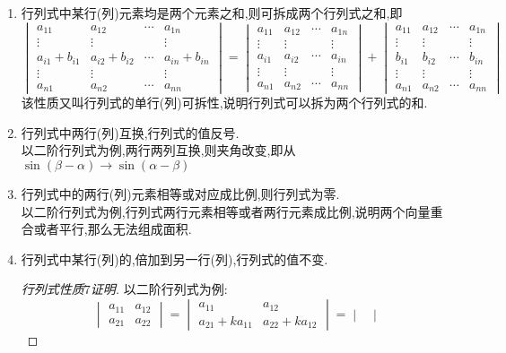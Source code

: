 \documentclass[8pt a4paper, oneside, UTF8]{ctexbook}
\begin{document}
\begin{sloppypar}
\begin{enumerate}
        \item 行列式中某行(列)元素均是两个元素之和,则可拆成两个行列式之和,即
        $$\begin{vmatrix}a_{11}&a_{12}&\cdots&a_{1n}\\\vdots&\vdots&&\vdots\\a_{i1}+b_{i1}&a_{i2}+b_{i2}&\cdots&a_{in}+b_{in}\\\vdots&\vdots&&\vdots\\a_{n1}&a_{n2}&\cdots&a_{nn}\end{vmatrix}=\begin{vmatrix}a_{11}&a_{12}&\cdots&a_{1n}\\\vdots&\vdots&&\vdots\\a_{i1}&a_{i2}&\cdots&a_{in}\\\vdots&\vdots&&\vdots\\a_{n1}&a_{n2}&\cdots&a_{nn}\end{vmatrix}+\begin{vmatrix}a_{11}&a_{12}&\cdots&a_{1n}\\\vdots&\vdots&&\vdots\\b_{i1}&b_{i2}&\cdots&b_{in}\\\vdots&\vdots&&\vdots\\a_{n1}&a_{n2}&\cdots&a_{nn}\end{vmatrix}$$
        该性质又叫行列式的单行(列)可拆性,说明行列式可以拆为两个行列式的和.
        \item 行列式中两行(列)互换,行列式的值反号.\\
        以二阶行列式为例,两行两列互换,则夹角改变,即从$\sin(\beta-\alpha) \rightarrow \sin(\alpha-\beta)$
        \item 行列式中的两行(列)元素相等或对应成比例,则行列式为零.\\
        以二阶行列式为例,行列式两行元素相等或者两行元素成比例,说明两个向量重合或者平行,那么无法组成面积.
        \item 行列式中某行(列)的,倍加到另一行(列),行列式的值不变.
        \begin{proof}[行列式性质$7$证明]
            以二阶行列式为例:
            $$
            \begin{vmatrix}
                a_{11} & a_{12}\\
                a_{21} & a_{22}
            \end{vmatrix}=\begin{vmatrix}
                a_{11} & a_{12}\\
                a_{21}+ka_{11} & a_{22}+ka_{12}
            \end{vmatrix}=\begin{vmatrix}

\end{vmatrix}$$
\end{proof}
\end{enumerate}
\end{sloppypar}
\end{document}
